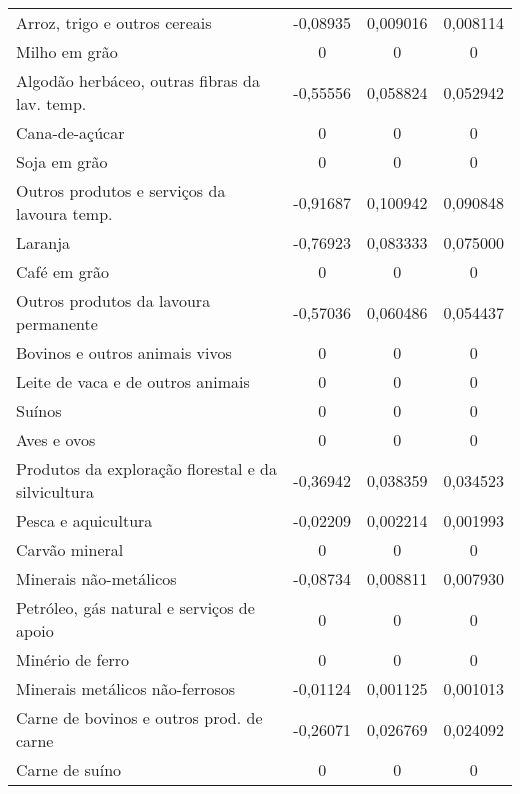 \begin{apendicesenv}
\begin{small}
\begin{center}
\begin{longtable}{m{8cm}ccc}
				Arroz, trigo e outros cereais                      & -0,08935 & 0,009016 & 0,008114 \\
				Milho em grão                                      & 0 & 0 & 0 \\
				Algodão herbáceo, outras fibras da lav. temp.      & -0,55556 & 0,058824 & 0,052942 \\
				Cana-de-açúcar                                     & 0 & 0 & 0 \\
				Soja  em grão                                      & 0 & 0 & 0 \\
				Outros produtos e serviços da lavoura temp.        & -0,91687 & 0,100942 & 0,090848 \\
				Laranja                                            & -0,76923 & 0,083333 & 0,075000 \\
				Café em grão                                       & 0 & 0 & 0 \\
				Outros produtos da lavoura permanente              & -0,57036 & 0,060486 & 0,054437 \\
				Bovinos e outros animais vivos                     & 0 & 0 & 0 \\
				Leite de vaca e de outros animais                  & 0 & 0 & 0 \\
				Suínos                                             & 0 & 0 & 0 \\
				Aves e ovos                                        & 0 & 0 & 0 \\
				Produtos da exploração florestal e da silvicultura & -0,36942 & 0,038359 & 0,034523 \\
				Pesca e aquicultura                                & -0,02209 & 0,002214 & 0,001993 \\
				Carvão mineral                                     & 0 & 0 & 0 \\
				Minerais não-metálicos                             & -0,08734 & 0,008811 & 0,007930 \\
				Petróleo, gás natural e   serviços de apoio        & 0 & 0 & 0 \\
				Minério de ferro                                   & 0 & 0 & 0 \\
				Minerais metálicos não-ferrosos                    & -0,01124 & 0,001125 & 0,001013 \\
				Carne de bovinos e outros   prod. de carne         & -0,26071 & 0,026769 & 0,024092 \\
				Carne de suíno                                     & 0 & 0 & 0 \\

\end{longtable}
\end{center}
\end{small}
\end{apendicesenv}
